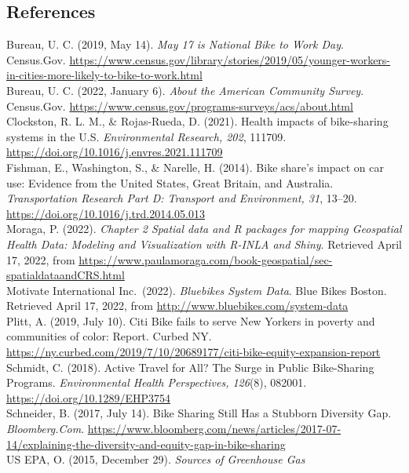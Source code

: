 \documentclass[
  12pt,
]{article}
\begin{document}
\begin{longtable}[]
\newpage

\hypertarget{references}{%
\section{References}\label{references}}

Bureau, U. C. (2019, May 14). \emph{May 17 is National Bike to Work
Day}. Census.Gov.
\url{https://www.census.gov/library/stories/2019/05/younger-workers-in-cities-more-likely-to-bike-to-work.html}\\
Bureau, U. C. (2022, January 6). \emph{About the American Community
Survey}. Census.Gov.
\url{https://www.census.gov/programs-surveys/acs/about.html}\\
Clockston, R. L. M., \& Rojas-Rueda, D. (2021). Health impacts of
bike-sharing systems in the U.S. \emph{Environmental Research, 202},
111709. \url{https://doi.org/10.1016/j.envres.2021.111709}\\
Fishman, E., Washington, S., \& Narelle, H. (2014). Bike share's impact
on car use: Evidence from the United States, Great Britain, and
Australia. \emph{Transportation Research Part D: Transport and
Environment, 31}, 13--20.
\url{https://doi.org/10.1016/j.trd.2014.05.013}\\
Moraga, P. (2022). \emph{Chapter 2 Spatial data and R packages for
mapping \textbar{} Geospatial Health Data: Modeling and Visualization
with R-INLA and Shiny}. Retrieved April 17, 2022, from
\url{https://www.paulamoraga.com/book-geospatial/sec-spatialdataandCRS.html}\\
Motivate International Inc.~(2022). \emph{Bluebikes System Data}. Blue
Bikes Boston. Retrieved April 17, 2022, from
\url{http://www.bluebikes.com/system-data}\\
Plitt, A. (2019, July 10). Citi Bike fails to serve New Yorkers in
poverty and communities of color: Report. Curbed NY.
\url{https://ny.curbed.com/2019/7/10/20689177/citi-bike-equity-expansion-report}\\
Schmidt, C. (2018). Active Travel for All? The Surge in Public
Bike-Sharing Programs. \emph{Environmental Health Perspectives, 126}(8),
082001. \url{https://doi.org/10.1289/EHP3754}\\
Schneider, B. (2017, July 14). Bike Sharing Still Has a Stubborn
Diversity Gap. \emph{Bloomberg.Com}.
\url{https://www.bloomberg.com/news/articles/2017-07-14/explaining-the-diversity-and-equity-gap-in-bike-sharing}\\
US EPA, O. (2015, December 29). \emph{Sources of Greenhouse Gas
}
\end{longtable}
\end{document}
